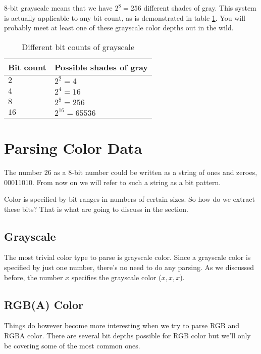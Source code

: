 8-bit grayscale means that we have $2^8=256$ different shades of
gray. This system is actually applicable to any bit count, as is
demonstrated in table \ref{tab:grayscale}. You will probably meet at least one of
these grayscale color depths out in the wild.

\begin{table}
  \centering
  \begin{tabular}{ll}
    \toprule
    Bit count & Possible shades of gray \\
    \midrule
    $2$ & $2^2 = 4$ \\
    $4$ & $2^4 = 16$ \\
    $8$ & $2^8 = 256$ \\
    $16$ & $2^{16} = 65536$ \\
    \bottomrule
  \end{tabular}
  \caption{Different bit counts of grayscale}
  \label{tab:grayscale}
\end{table}

\section{Parsing Color Data}
\label{sec:parsing-color-data}

The number $26$ as a 8-bit number could be written as a string of
ones and zeroes, 00011010. From now on we will refer to such a
string as a bit pattern.

Color is specified by bit ranges in numbers of certain
sizes. So how do we extract these bits? That is what are going to
discuss in the section.

\subsection{Grayscale}

The most trivial color type to parse is grayscale color. Since a
grayscale color is specified by just one number, there's no need to
do any parsing. As we discussed before, the number $x$ specifies the
grayscale color \mbox{($x,x,x$)}. 

\subsection{RGB(A) Color}

Things do however become more interesting when we try to parse RGB
and RGBA color. There are several bit depths possible for RGB
color but we'll only be covering some of the most common ones.


